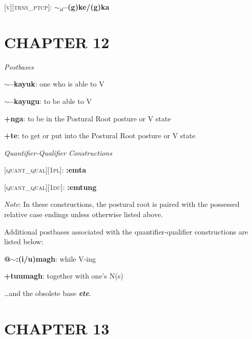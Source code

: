 \documentclass{article}
\begin{document}
\textsc{[v][trns\_ptcp]}: \textbf{$\sim_\text{sf}$--(g)ke/(g)ka}

\section{CHAPTER 12}

\textit{Postbases}
\begin{description}
\item \textbf{$\sim$--kayuk}: one who is able to V
\item \textbf{$\sim$--kayugu}: to be able to V
\item \textbf{+nga}: to be in the Postural Root posture or V state
\item \textbf{+te}: to get or put into the Postural Root posture or V state
\end{description}

\bigskip

\textit{Quantifier-Qualifier Constructions}

\textsc{[quant\_qual][1pl]}: \textbf{:emta}

\textsc{[quant\_qual][1du]}: \textbf{:emtung}

\bigskip

\textit{Note}: In these constructions, the postural root is paired with the possessed relative case endings unless otherwise listed above.

\bigskip

Additional postbases associated with the quantifier-qualifier constructions are listed below:
\begin{description}
\item \textbf{@$\sim$:(i/u)magh}: while V-ing
\item \textbf{+tuumagh}: together with one's N(s)
\end{description}

\bigskip

\ldots and the obsolete base \textit{\textbf{ete}}.

\section{CHAPTER 13}
\end{document}
